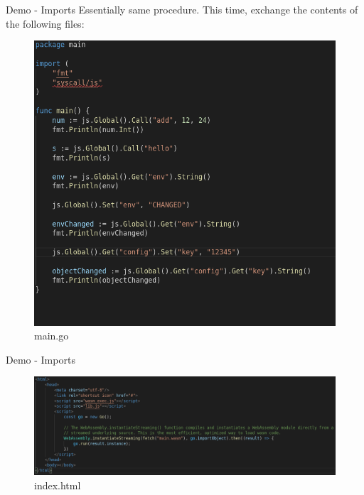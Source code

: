 \documentclass{beamer}
\begin{document}
\begin{frame}{Demo - Imports}
Essentially same procedure. This time, exchange the contents of the following files: 
\begin{figure}
    \includegraphics[scale=0.2]{./images/maingo.png}
    \caption{main.go}
\end{figure}

\end{frame}

\begin{frame}{Demo - Imports}
\begin{figure}
    \includegraphics[scale=0.25]{./images/jsindex.png}
    \caption{index.html}
\end{figure}

\end{frame}
\end{document}
